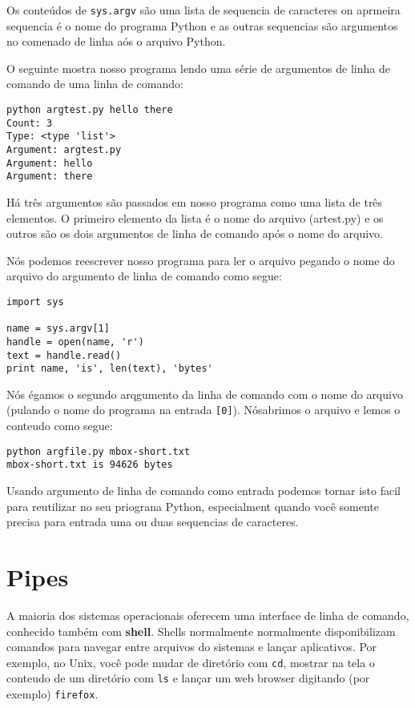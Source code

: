 %

Os conteúdos de {\tt sys.argv} são uma lista de sequencia de caracteres on aprmeira sequencia 
é o nome do programa Python e as outras sequencias são argumentos no comenado de linha aós o arquivo Python.

O seguinte mostra nosso programa lendo uma série de argumentos de linha de comando de uma linha de comando:

\begin{verbatim}
python argtest.py hello there
Count: 3
Type: <type 'list'>
Argument: argtest.py
Argument: hello
Argument: there
\end{verbatim}
%

Há três argumentos são passados em nosso programa como uma lista de três elementos. 
O primeiro elemento da lista é o nome do arquivo (artest.py) e os outros são
os dois argumentos de linha de comando após o nome do arquivo.

Nós podemos reescrever nosso programa para ler o arquivo pegando o nome do arquivo
do argumento de linha de comando como segue:

\begin{verbatim}
import sys

name = sys.argv[1]
handle = open(name, 'r')
text = handle.read()
print name, 'is', len(text), 'bytes'
\end{verbatim}

%
Nós égamos o segundo arqgumento da linha de comando com o nome do arquivo (pulando o nome do programa na entrada  {\tt [0]}).
Nósabrimos o arquivo e lemos o conteudo como segue:

\begin{verbatim}
python argfile.py mbox-short.txt
mbox-short.txt is 94626 bytes
\end{verbatim}

%
Usando argumento de linha de comando como entrada podemos tornar isto facil para reutilizar no seu priograna Python,
especialment quando você somente precisa para entrada uma ou duas sequencias de caracteres.

\section{Pipes}


A maioria dos sistemas operacionais oferecem uma interface de linha de comando,
conhecido também com {\bf shell}. Shells normalmente normalmente disponibilizam comandos para
navegar entre arquivos do sistemas e lançar aplicativos. Por exemplo, no Unix, você pode mudar de diretório
com {\tt cd}, mostrar na tela o conteudo de um diretório com {\tt ls} e lançar um web browser digitando (por exemplo)
{\tt firefox}.

